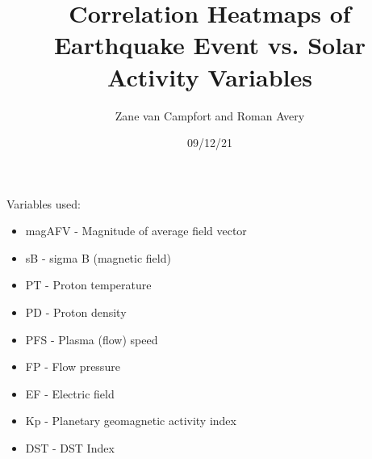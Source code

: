 \documentclass[12pt]{article}
\title{Correlation Heatmaps of Earthquake Event vs. Solar Activity Variables}
\author{Zane van Campfort and Roman Avery}
\date{09/12/21}
\begin{document}
\maketitle
\begin{large}
Variables used:

\begin{itemize}
  \item magAFV - Magnitude of average field vector
  \item sB - sigma B (magnetic field)
  \item PT - Proton temperature
  \item PD - Proton density
  \item PFS - Plasma (flow) speed
  \item FP - Flow pressure
  \item EF - Electric field
  \item Kp - Planetary geomagnetic activity index
  \item DST - DST Index
\end{itemize}
\end{large}

\graphicspath{{../plots/09_12/}}


\newpage
\end{document}
